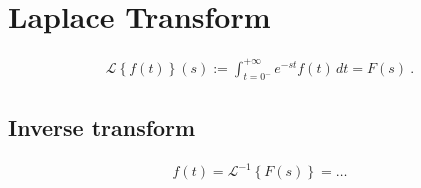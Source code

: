 \documentclass[letterpaper,10pt,english]{jupyterBook}
\begin{document}
\sphinxAtStartPar
{} 

\sphinxstepscope


\chapter{Laplace Transform}
\label{\detokenize{ch/complex/laplace:laplace-transform}}\label{\detokenize{ch/complex/laplace:complex-laplace}}\label{\detokenize{ch/complex/laplace::doc}}\begin{equation*}
\begin{split}\mathscr{L}\left\{ f(t) \right\}(s) := \int_{t=0^-}^{+\infty} e^{-st} f(t) \, dt = F(s) \ .\end{split}
\end{equation*}

\section{Inverse transform}
\label{\detokenize{ch/complex/laplace:inverse-transform}}\begin{equation*}
\begin{split}f(t) = \mathscr{L}^{-1}\left\{ F(s) \right\} = \dots\end{split}
\end{equation*}
\end{document}
